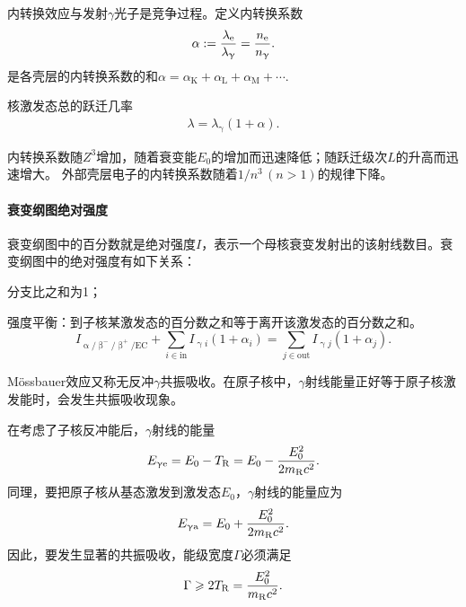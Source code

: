 内转换效应与发射$\gamma$光子是竞争过程。定义内转换系数
\begin{align}
	\alpha := \frac{\lambda_{\mathrm{e}}}{\lambda_\upgamma} = \frac{n_{\mathrm{e}}}{n_\upgamma}.
\end{align}
是各壳层的内转换系数的和$\alpha = \alpha_\mathrm K + \alpha_\mathrm L + \alpha_\mathrm M + \cdots.$

核激发态总的跃迁几率
\begin{align}
	\lambda = \lambda_\upgamma(1 + \alpha).
\end{align}

内转换系数随$Z^3$增加，随着衰变能$E_0$的增加而迅速降低；随跃迁级次$L$的升高而迅速增大。
外部壳层电子的内转换系数随着$1/n^3\,(n > 1)$的规律下降。
\paragraph{衰变纲图绝对强度}衰变纲图中的百分数就是绝对强度$I$，表示一个母核衰变发射出的该射线数目。衰变纲图中的绝对强度有如下关系：
\begin{compactenum}
	\item 分支比之和为1；
	\item 强度平衡：到子核某激发态的百分数之和等于离开该激发态的百分数之和。
	\begin{equation}\label{eq:nrd-decay-level-intensity-balance}
		I_{\upalpha/\upbeta^-/\upbeta^+/\mathrm{EC}} + \sum_{i\in\mathrm{in}} I_{\upgamma i}(1 + \alpha_i) = \sum_{j\in\mathrm{out}} I_{\upgamma j}(1 + \alpha_j).
	\end{equation}
\end{compactenum}

\label{Mossbauer}

Mössbauer效应又称无反冲$\gamma$共振吸收。在原子核中，$\gamma$射线能量正好等于原子核激发能时，会发生共振吸收现象。

在考虑了子核反冲能后，$\gamma$射线的能量
\begin{equation}\label{eq:nrd-gamma-emission-recoil}
	E_{\upgamma\mathrm e} = E_0 - T_{\mathrm{R}} = E_0 - \frac{E_0^2}{2m_{\mathrm{R}}c^2}.
\end{equation}
同理，要把原子核从基态激发到激发态$E_0$，$\gamma$射线的能量应为
\begin{equation}\label{eq:nrd-gamma-absorption-recoil}
	E_{\upgamma\mathrm a} = E_0 + \frac{E_0^2}{2m_{\mathrm{R}}c^2}.
\end{equation}
因此，要发生显著的共振吸收，能级宽度$\Gamma$必须满足
\begin{align}
	\Gamma \geqslant 2T_{\mathrm{R}} = \frac{E_0^2}{m_{\mathrm{R}}c^2}.
\end{align}

